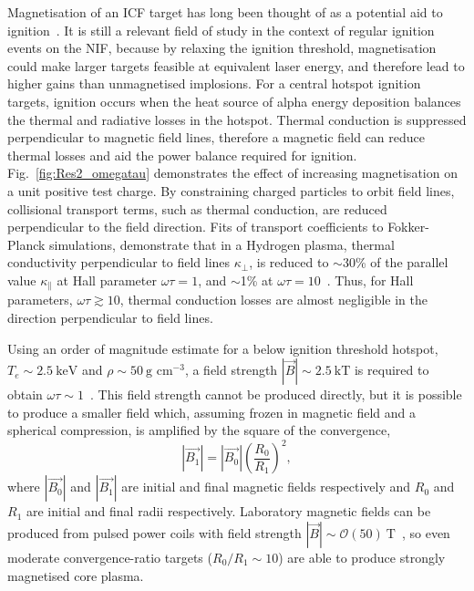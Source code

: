 Magnetisation of an \ac{ICF} target has long been thought of as a potential aid to ignition~\cite{lindemuth_parameter_1983,jones_physics_1986}.
It is still a relevant field of study in the context of regular ignition events on the \ac{NIF}, because by relaxing the ignition threshold, magnetisation could make larger targets feasible at equivalent laser energy, and therefore lead to higher gains than unmagnetised implosions.
For a central hotspot ignition targets, ignition occurs when the heat source of alpha energy deposition balances the thermal and radiative losses in the hotspot.
Thermal conduction is suppressed perpendicular to magnetic field lines, therefore a magnetic field can reduce thermal losses and aid the power balance required for ignition.
Fig.~\ref{fig:Res2_omegatau} demonstrates the effect of increasing magnetisation on a unit positive test charge.
By constraining charged particles to orbit field lines, collisional transport terms, such as thermal conduction, are reduced perpendicular to the field direction.
Fits of transport coefficients to Fokker-Planck simulations, demonstrate that in a Hydrogen plasma, thermal conductivity perpendicular to field lines $\kappa_{\perp}$, is reduced to $\sim$30\% of the parallel value $\kappa_{\parallel}$ at Hall parameter $\omega\tau=1$, and $\sim$1\% at $\omega\tau=10$~\cite{epperlein_plasma_1986}.
Thus, for Hall parameters, $\omega\tau\gtrsim 10$, thermal conduction losses are almost negligible in the direction perpendicular to field lines.

Using an order of magnitude estimate for a below ignition threshold hotspot, $T_e\sim 2.5\ \text{keV}$ and $\rho\sim50\ \text{g cm}^{-3}$, a field strength $|\vec{B}|\sim 2.5\ \text{kT}$ is required to obtain $\omega\tau\sim1$~\cite{oneill_modelling_2023}.
This field strength cannot be produced directly, but it is possible to produce a smaller field which, assuming frozen in magnetic field and a spherical compression, is amplified by the square of the convergence,
\begin{equation}
    \label{eq:Res2_flux_compression}
    |\vec{B_1}|=|\vec{B_0}| \left(\frac{R_0}{R_1}\right)^2,
\end{equation}
where $|\vec{B_0}|$ and $|\vec{B_1}|$ are initial and final magnetic fields respectively and $R_0$ and $R_1$ are initial and final radii respectively.
Laboratory magnetic fields can be produced from pulsed power coils with field strength $|\vec{B}|\sim\mathcal{O}(50)\ \text{T}$~\cite{fiksel_note_2015}, so even moderate convergence-ratio targets ($R_0/R_1\sim10$) are able to produce strongly magnetised core plasma.

